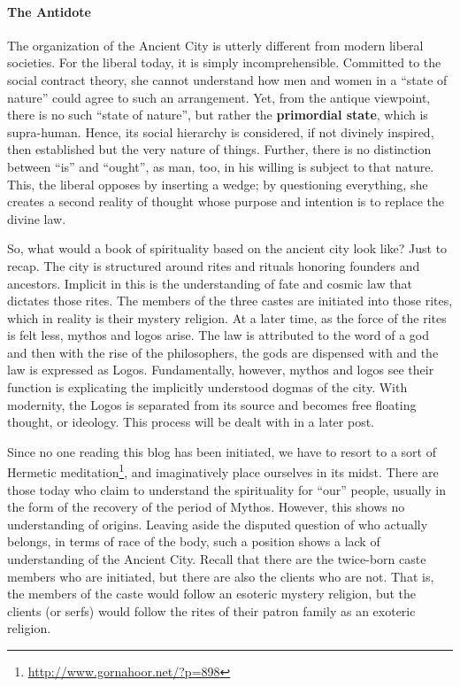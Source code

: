 \paragraph{The Antidote}


The organization of the Ancient City is utterly different from modern liberal societies. For the liberal today, it is simply incomprehensible. Committed to the social contract theory, she cannot understand how men and women in a ``state of nature'' could agree to such an arrangement. Yet, from the antique viewpoint, there is no such ``state of nature'', but rather the \textbf{primordial state}, which is supra-human. Hence, its social hierarchy is considered, if not divinely inspired, then established but the very nature of things. Further, there is no distinction between ``is'' and ``ought'', as man, too, in his willing is subject to that nature. This, the liberal opposes by inserting a wedge; by questioning everything, she creates a second reality of thought whose purpose and intention is to replace the divine law.

So, what would a book of spirituality based on the ancient city look like? Just to recap. The city is structured around rites and rituals honoring founders and ancestors. Implicit in this is the understanding of fate and cosmic law that dictates those rites. The members of the three castes are initiated into those rites, which in reality is their mystery religion. At a later time, as the force of the rites is felt less, mythos and logos arise. The law is attributed to the word of a god and then with the rise of the philosophers, the gods are dispensed with and the law is expressed as Logos. Fundamentally, however, mythos and logos see their function is explicating the implicitly understood dogmas of the city. With modernity, the Logos is separated from its source and becomes free floating thought, or ideology. This process will be dealt with in a later post.

Since no one reading this blog has been initiated, we have to resort to a sort of Hermetic meditation\footnote{\url{http://www.gornahoor.net/?p=898}}, and imaginatively place ourselves in its midst. There are those today who claim to understand the spirituality for ``our'' people, usually in the form of the recovery of the period of Mythos. However, this shows no understanding of origins. Leaving aside the disputed question of who actually belongs, in terms of race of the body, such a position shows a lack of understanding of the Ancient City. Recall that there are the twice-born caste members who are initiated, but there are also the clients who are not. That is, the members of the caste would follow an esoteric mystery religion, but the clients (or serfs) would follow the rites of their patron family as an exoteric religion.

